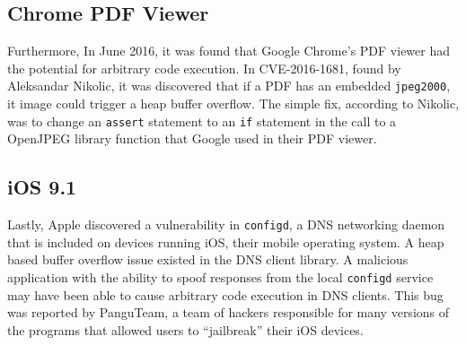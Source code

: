 \subsection{Chrome PDF Viewer}

Furthermore, In June 2016, it was found that Google Chrome's PDF viewer had the potential for arbitrary code execution. In CVE-2016-1681, found by Aleksandar Nikolic, it was discovered that if a PDF has an embedded \texttt{jpeg2000}, it image could trigger a heap buffer overflow. The simple fix, according to Nikolic, was to change an \texttt{assert} statement to an \texttt{if} statement in the call to a  OpenJPEG library function that Google used in their PDF viewer. \cite{chrome_pdf_2016}

\subsection{iOS 9.1}

Lastly, Apple discovered a vulnerability in \texttt{configd}, a DNS networking daemon that is included on devices running iOS, their mobile operating system. A heap based buffer overflow issue existed in the DNS client library. A malicious application with the ability to spoof responses from the local \texttt{configd} service may have been able to cause arbitrary code execution in DNS clients. This bug was reported by PanguTeam, a team of hackers responsible for many versions of the programs that allowed users to “jailbreak” their iOS devices. \cite{apple_ios_2016}

